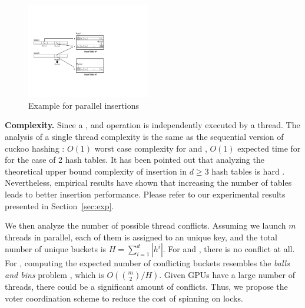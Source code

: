 \begin{figure}[t]
	\centering
	\includegraphics[width=0.48\textwidth]{fig/Voter.pdf}
	\vspace{-1em}
	\caption{Example for parallel insertions}
	\label{fig:voter}
\end{figure}
\vspace{1mm}\noindent\textbf{Complexity.}
Since a ,  and  operation is independently executed by a thread. 
The analysis of a single thread complexity is the same as the sequential version of cuckoo hashing \cite{pagh2004cuckoo}: $O(1)$ worst case complexity for  and , $O(1)$ expected time for  for the case of 2 hash tables. 
It has been pointed out that analyzing the theoretical upper bound complexity of insertion in $d \geq 3$ hash tables is hard \cite{alcantara2009real}.  
Nevertheless, empirical results have shown that increasing the number of tables leads to better insertion performance. Please refer to our experimental results presented in Section~\ref{sec:exp}.

We then analyze the number of possible thread conflicts. Assuming we launch $m$ threads in parallel, each of them is assigned to an unique key, and the total number of unique buckets is $H=\sum_{i=1}^d|h^i|$. For  and , there is no conflict at all. 
For , computing the expected number of conflicting buckets resembles the \emph{balls and bins} problem \cite{raab1998balls}, which is $O(\binom{m}{2}/H)$. 
Given GPUs have a large number of threads, there could be a significant amount of conflicts. Thus, we propose the voter coordination scheme to reduce the cost of spinning on locks. 
